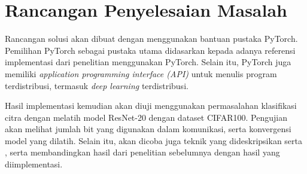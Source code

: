 \section{Rancangan Penyelesaian Masalah}
Rancangan solusi akan dibuat dengan menggunakan bantuan pustaka PyTorch. Pemilihan PyTorch sebagai pustaka utama didasarkan kepada adanya referensi implementasi dari penelitian \textcite{Chen2021CADA} menggunakan PyTorch. Selain itu, PyTorch juga memiliki \emph{application programming interface (API)} untuk menulis program terdistribusi, termasuk \emph{deep learning} terdistribusi.

Hasil implementasi kemudian akan diuji menggunakan permasalahan klasifikasi citra dengan melatih model ResNet-20 dengan dataset CIFAR100. Pengujian akan melihat jumlah bit yang digunakan dalam komunikasi, serta konvergensi model yang dilatih. Selain itu, akan dicoba juga teknik yang dideskripsikan \textcite{Chen2021CADA} serta \textcite{Chen2022Efficient}, serta membandingkan hasil dari penelitian sebelumnya dengan hasil yang diimplementasi.
